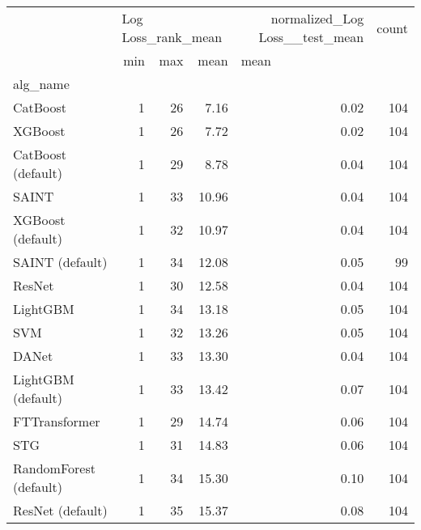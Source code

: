 \begin{tabular}{lrrrrr}
\toprule
{} & \multicolumn{3}{l}{Log Loss_rank_mean} & normalized_Log Loss__test_mean & count \\
{} &                min & max &   mean & \multicolumn{2}{l}{mean} \\
alg_name                &                    &     &        &                                &       \\
\midrule
CatBoost                &                  1 &  26 &   7.16 &                           0.02 &   104 \\
XGBoost                 &                  1 &  26 &   7.72 &                           0.02 &   104 \\
CatBoost (default)      &                  1 &  29 &   8.78 &                           0.04 &   104 \\
SAINT                   &                  1 &  33 &  10.96 &                           0.04 &   104 \\
XGBoost (default)       &                  1 &  32 &  10.97 &                           0.04 &   104 \\
SAINT (default)         &                  1 &  34 &  12.08 &                           0.05 &    99 \\
ResNet                  &                  1 &  30 &  12.58 &                           0.04 &   104 \\
LightGBM                &                  1 &  34 &  13.18 &                           0.05 &   104 \\
SVM                     &                  1 &  32 &  13.26 &                           0.05 &   104 \\
DANet                   &                  1 &  33 &  13.30 &                           0.04 &   104 \\
LightGBM (default)      &                  1 &  33 &  13.42 &                           0.07 &   104 \\
FTTransformer           &                  1 &  29 &  14.74 &                           0.06 &   104 \\
STG                     &                  1 &  31 &  14.83 &                           0.06 &   104 \\
RandomForest (default)  &                  1 &  34 &  15.30 &                           0.10 &   104 \\
ResNet (default)        &                  1 &  35 &  15.37 &                           0.08 &   104 \\

\end{tabular}
